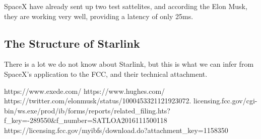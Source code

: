 \documentclass[12pt]{article}
\begin{document}

SpaceX have already sent up two test sattelites, and according the Elon Musk, they are working very well, providing a latency of only 25ms\cite{ElonMuskTweet}.


\subsection{The Structure of Starlink}

There is a lot we do not know about Starlink, but this is what we can infer from SpaceX’s application to the FCC\cite{FCCApplication}, and their technical attachment\cite{TechnicalAttachment}.




\begin{thebibliography}{9}
 https://www.exede.com/
 https://www.hughes.com/
 https://twitter.com/elonmusk/status/1000453321121923072.
 licensing.fcc.gov/cgi-bin/ws.exe/prod/ib/forms/reports/related_filing.hts?f_key=-289550&f_number=SATLOA2016111500118
 https://licensing.fcc.gov/myibfs/download.do?attachment_key=1158350
\end{thebibliography}
\end{document}
